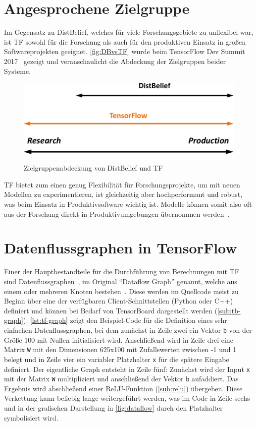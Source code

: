 \section{Angesprochene Zielgruppe}
Im Gegensatz zu DistBelief, welches für viele Forschungsgebiete zu unflexibel war, ist \gls{TF} sowohl für die Forschung als auch für den produktiven Einsatz in großen Softwareprojekten geeignet. \autoref{fig:DBvsTF} wurde beim TensorFlow Dev Summit 2017~\cite{tf-sum17-keynote} gezeigt und veranschaulicht die Abdeckung der Zielgruppen beider Systeme.

\vspace{0.3cm}
\begin{figure}[htb!]
	\centering
	 \includegraphics[width=.7\textwidth]{images/DistBeliefvsTensorFlow.pdf}\\
	\vspace{10pt} 
	\caption{Zielgruppenabdeckung von DistBelief und \gls{TF}~\cite{tf-sum17-keynote}}
	\label{fig:DBvsTF}
\end{figure}

\gls{TF} bietet zum einen genug Flexibilität für Forschungsprojekte, um mit neuen Modellen zu experimentieren, ist gleichzeitig aber hochperformant und robust, was beim Einsatz in Produktivsoftware wichtig ist. Modelle können somit also oft aus der Forschung direkt in Produktivumgebungen übernommen werden~\cite{tensorflow2016-whitepaper}.

\section{Datenflussgraphen in TensorFlow}
Einer der Hauptbestandteile für die Durchführung von Berechnungen mit \gls{TF} sind Datenflussgraphen~\cite{dataflow}, im Original "`Dataflow Graph"' genannt, welche aus einem oder mehreren Knoten bestehen~\cite{tensorflow2015-whitepaper}. Diese werden im Quellcode meist zu Beginn über eine der verfügbaren Client-Schnittstellen (Python oder C++) definiert und können bei Bedarf von TensorBoard dargestellt werden (\autoref{sub:tb-graph}). \autoref{lst:tf-graph} zeigt den Beispiel-Code für die Definition eines sehr einfachen Datenflussgraphen, bei dem zunächst in Zeile zwei ein Vektor \lstinline$b$ von der Größe 100 mit Nullen initialisiert wird. Anschließend wird in Zeile drei eine Matrix \lstinline$W$ mit den Dimensionen 625x100 mit Zufallswerten zwischen -1 und 1 belegt und in Zeile vier ein variabler Platzhalter \lstinline$x$ für die spätere Eingabe definiert. Der eigentliche Graph entsteht in Zeile fünf: Zunächst wird der Input \lstinline$x$ mit der Matrix \lstinline$W$ multipliziert und anschließend der Vektor \lstinline$b$ aufaddiert. Das Ergebnis wird abschließend einer \gls{ReLU}-Funktion (\autoref{sub:relu}) übergeben. Diese Verkettung kann beliebig lange weitergeführt werden, was im Code in Zeile sechs und in der grafischen Darstellung in \autoref{fig:dataflow} durch den Platzhalter symbolisiert wird.

